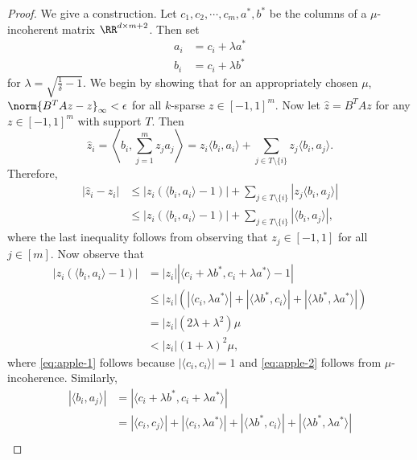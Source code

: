 \documentclass[10pt]{article}
\begin{document}
\begin{ReviewVerbatim}
\begin{proof}
    We give a construction. Let $c_1,c_2,\cdots,c_m,a^*,b^*$ be the columns of a $\mu$-incoherent matrix $\RR^{d\times m+2}$. Then set
    \begin{align}
        a_i &= c_i + \lambda a^*\\
        b_i &= c_i + \lambda b^*
    \end{align}
    for $\lambda = \sqrt{\frac{1}{\delta} - 1}.$
    We begin by showing that for an appropriately chosen $\mu$, $\norm{B^TAz - z}_\infty < \epsilon$ for all $k$-sparse $z\in [-1,1]^m.$ Now let $\hat{z} = B^TAz$ for any $z\in [-1,1]^m$ with support $T$. Then
    \begin{equation}
        \hat{z}_i = \left\langle b_i, \sum_{j=1}^m z_ja_j \right\rangle
        = z_i\langle b_i, a_i\rangle + \sum_{j\in T\setminus \{i\}} z_j\langle b_i, a_j\rangle.
    \end{equation}
    Therefore,
    \begin{align}
        |\hat{z}_i - z_i| &\le |z_i(\langle b_i, a_i\rangle - 1)| + \sum_{j\in T\setminus \{i\}} |z_j\langle b_i, a_j\rangle|\\
        &\le |z_i(\langle b_i, a_i \rangle - 1)| + \sum_{j\in T\setminus \{i\}} |\langle b_i, a_j\rangle|,
    \end{align}
    where the last inequality follows from observing that $z_j \in [-1,1]$ for all $j\in [m].$ Now observe that
    \begin{align}
        |z_i(\langle b_i, a_i\rangle - 1)| &= |z_i||\langle c_i + \lambda b^*, c_i + \lambda a^*\rangle - 1|\\
        &\le |z_i|\left(|\langle c_i, \lambda a^*\rangle| + |\langle \lambda b^*, c_i \rangle| + |\langle \lambda b^*, \lambda a^* \rangle|\right) \label{eq:apple-1}\\
        &= |z_i|(2\lambda  + \lambda^2)\mu\label{eq:apple-2}\\
        &< |z_i|(1 + \lambda)^2\mu,
    \end{align}
    where \eqref{eq:apple-1} follows because $|\langle c_i, c_i \rangle| = 1$ and \eqref{eq:apple-2} follows from $\mu$-incoherence. Similarly,
    \begin{align}
        |\langle b_i, a_j\rangle| &= |\langle c_i + \lambda b^*, c_i + \lambda a^*\rangle|\\
        &= |\langle c_i, c_j\rangle| + |\langle c_i, \lambda a^*\rangle| + |\langle \lambda b^*, c_i \rangle| + |\langle \lambda b^*, \lambda a^* \rangle|\\

\end{align}
\end{proof}
\end{ReviewVerbatim}
\end{document}
